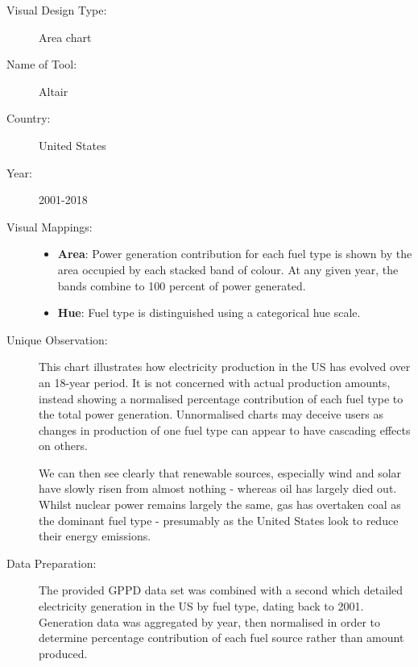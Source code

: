 \begin{description}
\item[Visual Design Type:]
Area chart
\item[Name of Tool:]
Altair
\item[Country:]
United States
\item[Year:]
2001-2018

\item[Visual Mappings:]
\begin{itemize}
  \item \textbf{Area}: Power generation contribution for each fuel type is shown by the area occupied by each stacked band of colour. At any given year, the bands combine to 100 percent of power generated.
  \item \textbf{Hue}: Fuel type is distinguished using a categorical hue scale.
\end{itemize}

\item[Unique Observation:]
This chart illustrates how electricity production in the US has evolved over an 18-year period. It is not concerned with actual production amounts, instead showing a normalised percentage contribution of each fuel type to the total power generation. Unnormalised charts may deceive users as changes in production of one fuel type can appear to have cascading effects on others.

We can then see clearly that renewable sources, especially wind and solar have slowly risen from almost nothing - whereas oil has largely died out. Whilst nuclear power remains largely the same, gas has overtaken coal as the dominant fuel type - presumably as the United States look to reduce their energy emissions.

\item[Data Preparation:]
The provided GPPD data set was combined with a second which detailed electricity generation in the US by fuel type, dating back to 2001. Generation data was aggregated by year, then normalised in order to determine percentage contribution of each fuel source rather than amount produced.

\end{description}

